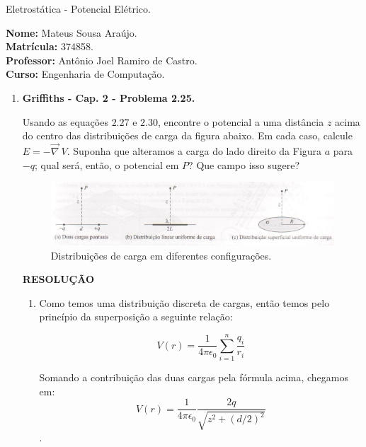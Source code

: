 \documentclass[11pt,a4paper]{article}
\begin{document}
	\begin{center}
		\Large Eletrostática - Potencial Elétrico. 
	\end{center}

\begin{flushleft}
\textbf{Nome:} Mateus Sousa Araújo. \\
\textbf{Matrícula:} 374858. \\
\textbf{Professor:} Antônio Joel Ramiro de Castro. \\
\textbf{Curso:} Engenharia de Computação. \\
\end{flushleft}

\begin{enumerate}

\item \textbf{Griffiths - Cap. 2 - Problema 2.25.}

Usando as equações $2.27$ e $2.30$, encontre o potencial a uma distância $z$ acima do centro das distribuições de carga da figura abaixo. Em cada caso, calcule $E = -\vec{\nabla} \ V$. Suponha que alteramos a carga do lado direito da Figura $a$ para $-q$; qual será, então, o potencial em $P$? Que campo isso sugere?

\begin{figure}[h]	
\centering %
\includegraphics[width=13cm]{Selection_083.jpg} 
\caption{Distribuições de carga em diferentes configurações.}
\end{figure}


\textbf{RESOLUÇÃO}

\begin{enumerate}

\item 

Como temos uma distribuição discreta de cargas, então temos pelo princípio da superposição a seguinte relação:

$$V(r) = \displaystyle\dfrac{1}{4\pi\epsilon_0}\displaystyle\sum_{i=1}^n \displaystyle\dfrac{q_i}{r_i}$$

Somando a contribuição das duas cargas pela fórmula acima, chegamos em:
$$V(r) = \displaystyle\dfrac{1}{4\pi\epsilon_0} \displaystyle\dfrac{2q}{\sqrt{z^2 + (d/2)^2}}$$.


\end{enumerate}
\end{enumerate}
\end{document}
